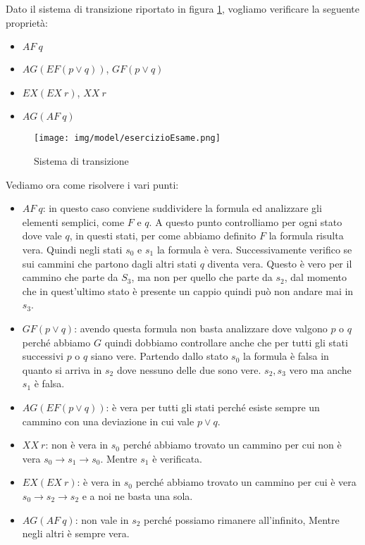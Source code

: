 \begin{esempio} 
    Dato il sistema di transizione riportato in figura \ref{fig:esercizioEsame},
    vogliamo verificare la seguente proprietà:
    \begin{itemize}
        \item $AF \ q$
        \item $AG (EF (p \lor q))$, $GF(p \lor q)$
        \item $EX (EX \ r)$, $XX \ r$
        \item $AG (AF \ q)$
    \end{itemize}
    \begin{figure}[!ht]
        \centering
        \texttt{[image: img/model/esercizioEsame.png]}
        \caption{Sistema di transizione}
        \label{fig:esercizioEsame}
    \end{figure}
    Vediamo ora come risolvere i vari punti:
    \begin{itemize}
        \item $AF \ q$: in questo caso conviene suddividere la formula ed
              analizzare gli elementi semplici, come $F$ e $q$. A questo punto
              controlliamo per ogni stato dove vale $q$, in questi stati, per
              come abbiamo definito $F$ la formula risulta vera. Quindi negli
              stati $s_0$ e $s_1$ la formula è vera. Successivamente verifico se
              sui cammini che partono dagli altri stati $q$ diventa vera. Questo
              è vero per il cammino che parte da $S_3$, ma non per quello che parte
              da $s_2$, dal momento che in quest'ultimo stato è presente un
              cappio quindi può non andare mai in $s_3$.
        \item $GF(p \lor q)$: avendo questa formula non basta analizzare dove
              valgono $p$ o $q$ perché abbiamo $G$ quindi dobbiamo controllare
              anche che per tutti gli stati successivi $p$ o $q$ siano vere.
              Partendo dallo stato $s_0$ la formula è falsa in quanto si arriva
              in $s_2$ dove nessuno delle due sono vere. $s_2,s_3$ vero ma anche
              $s_1$ è falsa.
        \item $AG (EF (p \lor q))$: è vera per tutti gli stati perché esiste
              sempre un cammino con una deviazione in cui vale $p \lor q$.
        \item $XX \ r$: non è vera in $s_0$ perché abbiamo trovato un cammino
              per cui non è vera $s_0\to s_1\to s_0$. Mentre $s_1$ è verificata.
        \item $EX (EX \ r)$: è vera in $s_0$ perché abbiamo trovato un cammino
              per cui è vera $s_0\to s_2\to s_2$ e a noi ne basta una sola.
        \item $AG (AF \ q)$: non vale in $s_2$ perché possiamo rimanere
              all'infinito, Mentre negli altri è sempre vera.
    \end{itemize}
\end{esempio}
